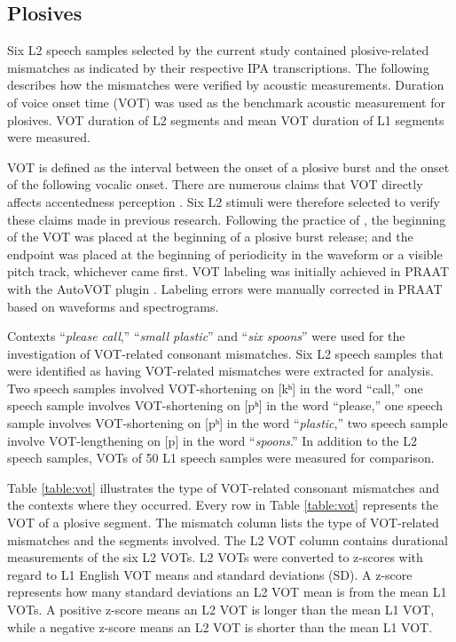 \subsection{Plosives}

Six L2 speech samples selected by the current study contained plosive-related mismatches as indicated by their respective IPA transcriptions. The following describes how the mismatches were verified by acoustic measurements. Duration of voice onset time (VOT) was used as the benchmark acoustic measurement for plosives. VOT duration of L2 segments and mean VOT duration of L1 segments were measured. 

VOT is defined as the interval between the onset of a plosive burst and the onset of the following vocalic onset. There are numerous claims that VOT directly affects accentedness perception \citep{Major_1987, Riney_1999}. Six L2 stimuli were therefore selected to verify these claims made in previous research. Following the practice of \citet{Chodroff_2017}, the beginning of the VOT was placed at the beginning of a plosive burst release; and the endpoint was placed at the beginning of periodicity in the waveform or a visible pitch track, whichever came first. VOT labeling was initially achieved in PRAAT with the AutoVOT plugin \citep{Keshet_2014}. Labeling errors were manually corrected in PRAAT based on waveforms and spectrograms. 

Contexts “\textit{please call},” “\textit{small plastic}” and “\textit{six spoons}” were used for the investigation of VOT-related consonant mismatches. Six L2 speech samples that were identified as having VOT-related mismatches were extracted for analysis. Two speech samples involved VOT-shortening on [kʰ] in the word “call,” one speech sample involves VOT-shortening on [pʰ] in the word “please,” one speech sample involves VOT-shortening on [pʰ] in the word “\textit{plastic},” two speech sample involve VOT-lengthening on [p] in the word “\textit{spoons}.” In addition to the L2 speech samples, VOTs of 50 L1 speech samples were measured for comparison. 

Table \ref{table:vot} illustrates the type of VOT-related consonant mismatches and the contexts where they occurred. Every row in Table \ref{table:vot} represents the VOT of a plosive segment. The mismatch column lists the type of VOT-related mismatches and the segments involved. The L2 VOT column contains durational measurements of the six L2 VOTs. L2 VOTs were converted to z-scores with regard to L1 English VOT means and standard deviations (SD). A z-score represents how many standard deviations an L2 VOT mean is from the mean L1 VOTs. A positive z-score means an L2 VOT is longer than the mean L1 VOT, while a negative z-score means an L2 VOT is shorter than the mean L1 VOT.

